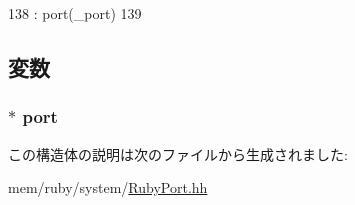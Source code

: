 \begin{DoxyCode}
138                                           : port(_port)
139         {}
\end{DoxyCode}


\subsection{変数}
\hypertarget{structRubyPort_1_1SenderState_a82291d8c80c17c219acfb5f466c8516e}{
\subsubsection[{port}]{$\ast$ {\bf port}}}
\label{structRubyPort_1_1SenderState_a82291d8c80c17c219acfb5f466c8516e}


この構造体の説明は次のファイルから生成されました:\begin{DoxyCompactItemize}
\item 
mem/ruby/system/\hyperlink{RubyPort_8hh}{RubyPort.hh}\end{DoxyCompactItemize}

